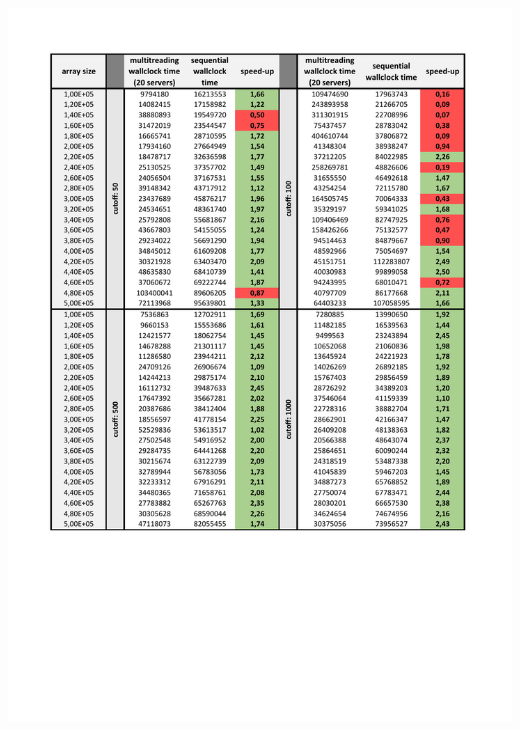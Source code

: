 \documentclass{article}
\begin{document}
\begingroup
\centering
\vspace*{-0.1in}
\includegraphics[page=1, width=\linewidth]{imgs/CutOff50-1000.pdf}
\endgroup
\end{document}

